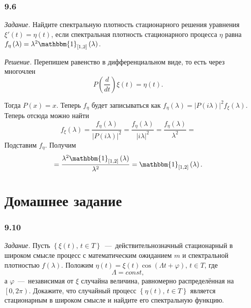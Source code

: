 \subsubsection*{9.6}

\textit{Задание.}
Найдите спектральную плотность стационарного решения уравнения
$ \xi' \left( t \right) =
  \eta \left( t \right) $,
если спектральная плотность стационарного процесса $ \eta $ равна
$f_{ \eta } \left( \lambda \right) =
  \lambda^2 \mathbbm{1}_{ \left[ 1, 2 \right] } \left( \lambda \right) $.

\textit{Решение.}
Перепишем равенство в дифференциальном виде, то есть через многочлен
\begin{equation*}
  P \left( \frac{d}{dt} \right) \xi \left( t \right) =
  \eta \left( t \right).
\end{equation*}

Тогда $P \left( x \right) = x$.
Теперь $f_{ \eta }$ будет записываться как
$f_{ \eta } \left( \lambda \right) =
  \left| P \left( i \lambda \right) \right|^2
  f_{ \xi } \left( \lambda \right) $.
Теперь отсюда можно найти
\begin{equation*}
  f_{ \xi } \left( \lambda \right) =
  \frac{f_{ \eta } \left( \lambda \right) }{ \left| P \left( i \lambda \right) \right|^2} =
  \frac{f_{ \eta } \left( \lambda \right) }{ \left| i \lambda \right|^2} =
  \frac{f_{ \eta } \left( \lambda \right) }{ \lambda^2} =
\end{equation*}
Подставим $f_{ \eta }$.
Получим
\begin{equation*}
  = \frac{ \lambda^2 \mathbbm{1}_{ \left[ 1, 2 \right] } \left( \lambda \right) }{ \lambda^2 } =
  \mathbbm{1}_{ \left[ 1, 2 \right] } \left( \lambda \right).
\end{equation*}

\section*{Домашнее задание}

\subsubsection*{9.10}

\textit{Задание.}
Пусть $ \left\{ \xi \left( t \right), \, t \in T \right\} $~---~действительнозначный
стационарный в широком смысле процесс с математическим ожиданием $m$ и спектральной плотностью
$f \left( \lambda \right) $.
Положим
$ \eta \left( t \right) = \xi \left( t \right) \cos \left( \Lambda t + \varphi \right), \,
  t \in T$,
где
\begin{equation*}
  \Lambda =
  const,
\end{equation*}
а $\varphi$~---~независимая от $ \xi $ случайна величина,
равномерно распределённая на $ \left[ 0, 2 \pi \right) $.
Докажите, что случайный процесс $ \left\{ \eta \left( t \right), \, t \in T \right\} $
является стационарным в широком смысле и найдите его спектральную функцию.

